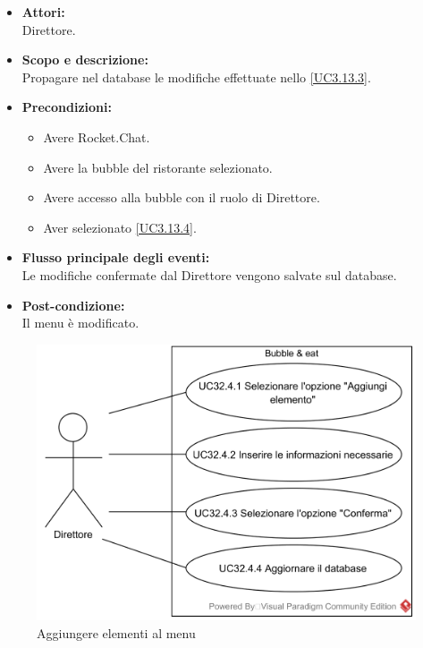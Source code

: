 
\begin{itemize}
	\item \textbf{Attori:}
	\\Direttore.
	\item \textbf{Scopo e descrizione:} 
	\\Propagare nel database le modifiche effettuate nello \ref{UC3.13.3}.
	\item \textbf{Precondizioni:}
	\begin{itemize}
		\item Avere Rocket.Chat.
		\item Avere la bubble del ristorante selezionato.
		\item Avere accesso alla bubble con il ruolo di Direttore.
		\item Aver selezionato  \ref{UC3.13.4}.
	\end{itemize}
	\item \textbf{Flusso principale degli eventi:}
	\\Le modifiche confermate dal Direttore vengono salvate sul database.
	\item \textbf{Post-condizione:}
	\\Il menu è modificato.
\end{itemize}

\begin{samepage}
\nopagebreak
\begin{figure}[H]
	\centering
	\includegraphics[width=15cm]{../../documenti/AnalisiDeiRequisiti/Diagrammi_img/usecase/uc3_13_4.png}
	\caption{\UCFCaption{} Aggiungere elementi al menu}
\end{figure}
\end{samepage}


